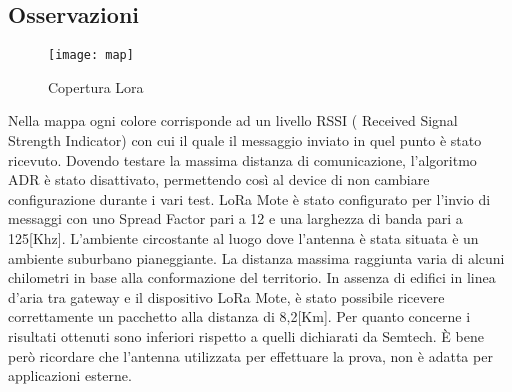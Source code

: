 \subsection{Osservazioni}

\begin{figure}[th]
        \centering 
                \texttt{[image: map]}
        \caption{Copertura Lora}
        \label{fig:map}
\end{figure}
Nella mappa ogni colore corrisponde ad un livello  RSSI ( Received
Signal Strength Indicator) con cui il quale il messaggio inviato in quel punto 
è stato ricevuto.
Dovendo testare la massima distanza di comunicazione, l'algoritmo ADR è stato disattivato,
permettendo così al device di non cambiare configurazione durante i vari test.
LoRa Mote è stato configurato 
per l'invio di messaggi con uno Spread Factor pari a 12 e una larghezza
di banda pari a 125[Khz]. L'ambiente circostante
al luogo dove l'antenna è stata situata è un ambiente suburbano pianeggiante.
La distanza massima raggiunta varia di alcuni chilometri in base alla
conformazione del territorio. In assenza di edifici in linea d'aria tra gateway
e il dispositivo LoRa Mote, è stato possibile ricevere correttamente un 
pacchetto alla distanza di 8,2[Km].
Per quanto concerne i risultati ottenuti sono inferiori rispetto a quelli
dichiarati da Semtech. È bene però ricordare che l'antenna utilizzata per
effettuare la prova, non è adatta per applicazioni esterne. 

